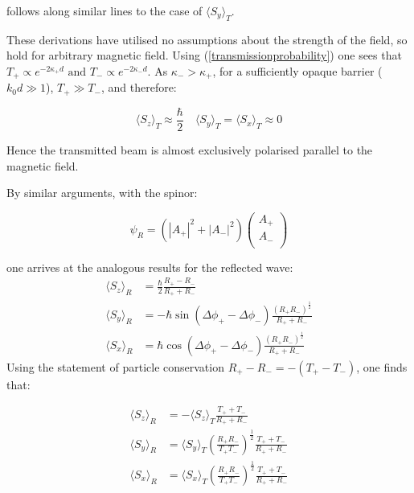 \documentclass{article}
\begin{document}
\noindent follows along similar lines to the case of $\langle S_y \rangle_T$.

\noindent These derivations have utilised no assumptions about the strength of the field, so hold for arbitrary magnetic field. Using (\ref{transmissionprobability}) one sees that $T_+ \propto e^{-2\kappa_+d} \text{ and } T_- \propto e^{-2\kappa_-d}$. As $\kappa_- > \kappa_+$, for a sufficiently opaque barrier ($k_0d \gg 1$), $T_+ \gg T_-$, and therefore:

\begin{equation}
	\langle S_z \rangle_T \approx \frac{\hbar}{2} \quad \langle S_y \rangle_T = \langle S_x \rangle_T \approx 0
\end{equation}

\noindent Hence the transmitted beam is almost exclusively polarised parallel to the magnetic field.

\noindent By similar arguments, with the spinor:

\begin{equation}
	\psi_R = (|A_{+}|^2+|A_{-}|^2)
	\begin{pmatrix}
		A_{+}\\
		A_{-}\\
	\end{pmatrix}
\end{equation}

\noindent one arrives at the analogous results for the reflected wave:
\begin{subequations}
\begin{align}
	\langle S_z \rangle_R &= \frac{\hbar}{2}\frac{R_+-R_-}{R_++R_-}\\
	\langle S_y \rangle_R &= -\hbar \sin{(\Delta\phi_+-\Delta\phi_-)}\frac{(R_+R_-)^{\frac{1}{2}}}{R_++R_-}\\
	\langle S_x \rangle_R &= \hbar \cos{(\Delta\phi_+-\Delta\phi_-)}\frac{(R_+R_-)^{\frac{1}{2}}}{R_++R_-}
\end{align}
\end{subequations}
\noindent Using the statement of particle conservation $R_+-R_-=-(T_+-T_-)$, one finds that:

\begin{subequations}
\label{stsrrelations}
\begin{align}
	\langle S_z \rangle_R &= -\langle S_z \rangle_T \frac{T_++T_-}{R_++R_-}\\
	\langle S_y \rangle_R &= \langle S_y \rangle_T \left(\frac{R_+R_-}{T_+T_-}\right)^{\frac{1}{2}}\frac{T_++T_-}{R_++R_-} \\
	\langle S_x \rangle_R &= \langle S_x \rangle_T \left(\frac{R_+R_-}{T_+T_-}\right)^{\frac{1}{2}}\frac{T_++T_-}{R_++R_-}
\end{align}
\end{subequations}
\end{document}
